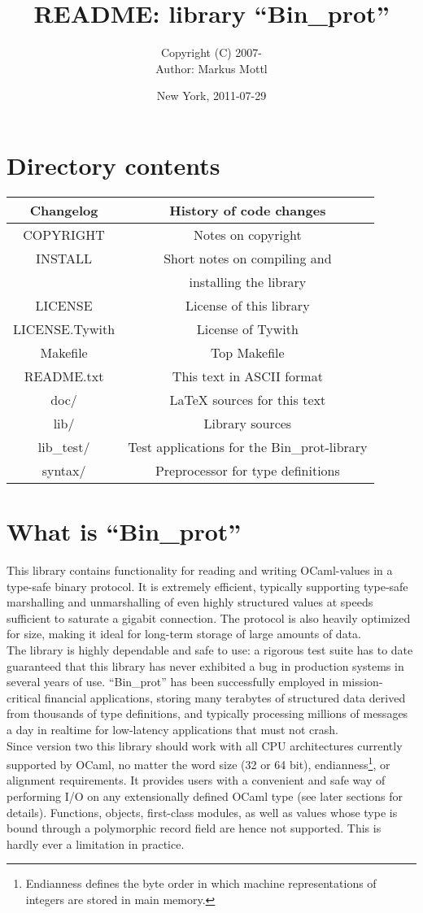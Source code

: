 \documentclass[12pt]{article}
\title{README: library ``Bin\_prot''}
\author{
  Copyright (C) 2007-\theyear \quad \janeshort\\
  Author: Markus Mottl
}
\date{New York, 2011-07-29}
\newcommand{\trow}[2]{\quad #1 \quad&\quad #2 \quad\\}
\newcommand{\trowl}[2]{\trow{#1}{#2}\hline}
\begin{document}
\maketitle
\section{Directory contents}
\begin{center}
\begin{tabular}{|c|c|}
\hline
\trowl{Changelog}{History of code changes}
\trowl{COPYRIGHT}{Notes on copyright}
\trow{INSTALL}{Short notes on compiling and}
\trowl{}{installing the library}
\trowl{LICENSE}{License of this library}
\trowl{LICENSE.Tywith}{License of Tywith}
\trowl{Makefile}{Top Makefile}
\trowl{README.txt}{This text in ASCII format}
\trowl{doc/}{LaTeX sources for this text}
\trowl{lib/}{Library sources}
\trowl{lib\_test/}{Test applications for the Bin\_prot-library}
\trowl{syntax/}{Preprocessor for type definitions}
\end{tabular}
\end{center}

\section{What is ``Bin\_prot''}

This library contains functionality for reading and writing OCaml-values in a
type-safe binary protocol.  It is extremely efficient, typically supporting
type-safe marshalling and unmarshalling of even highly structured values at
speeds sufficient to saturate a gigabit connection.  The protocol is also
heavily optimized for size, making it ideal for long-term storage of large
amounts of data.\\

The library is highly dependable and safe to use: a rigorous test suite has
to date guaranteed that this library has never exhibited a bug in production
systems in several years of use.  ``Bin\_prot'' has been successfully
employed in mission-critical financial applications, storing many terabytes
of structured data derived from thousands of type definitions, and typically
processing millions of messages a day in realtime for low-latency applications
that must not crash.\\

Since version two this library should work with all CPU architectures
currently supported by OCaml, no matter the word size (32 or 64 bit),
endianness\footnote{Endianness defines the byte order in which machine
representations of integers are stored in main memory.}, or alignment
requirements.  It provides users with a convenient and safe way of performing
I/O on any extensionally defined OCaml type (see later sections for details).
Functions, objects, first-class modules, as well as values whose type is
bound through a polymorphic record field are hence not supported.  This is
hardly ever a limitation in practice.\\
\end{document}
